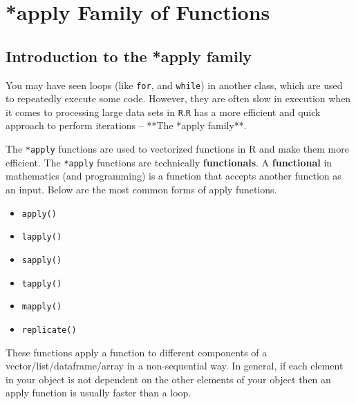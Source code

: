 \documentclass[
]{book}
\providecommand{\tightlist}{%
  \setlength{\itemsep}{0pt}\setlength{\parskip}{0pt}}
\begin{document}
\hypertarget{apply-family-of-functions}{%
\chapter{*apply Family of Functions}\label{apply-family-of-functions}}

\hypertarget{introduction-to-the-apply-family}{%
\section{Introduction to the *apply family}\label{introduction-to-the-apply-family}}

You may have seen loops (like \texttt{for}, and \texttt{while}) in another class, which are used to repeatedly execute some code. However, they are often slow in execution when it comes to processing large data sets in \texttt{R}.\texttt{R} has a more efficient and quick approach to perform iterations -- **The *apply family**.

The \texttt{*apply} functions are used to vectorized functions in R and make them more efficient. The \texttt{*apply} functions are technically \textbf{functionals}. A \textbf{functional} in mathematics (and programming) is a function that accepts another function as an input. Below are the most common forms of apply functions.

\begin{itemize}
\tightlist
\item
  \texttt{apply()}
\item
  \texttt{lapply()}
\item
  \texttt{sapply()}
\item
  \texttt{tapply()}
\item
  \texttt{mapply()}
\item
  \texttt{replicate()}
\end{itemize}

These functions apply a function to different components of a vector/list/dataframe/array in a non-sequential way. In general, if each element in your object is not dependent on the other elements of your object then an apply function is usually faster than a loop.
\end{document}
